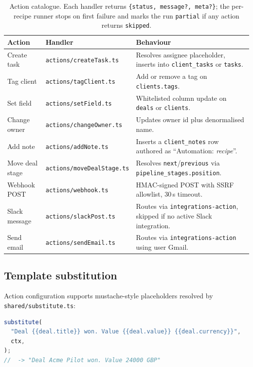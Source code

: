 \documentclass[11pt,a4paper,oneside]{article}
\newcommand{\code}[1]{\texttt{\small #1}}
\begin{document}
\begin{table}[H]
\centering
\small
\begin{tabularx}{\textwidth}{@{}llX@{}}
\toprule
\textbf{Action}     & \textbf{Handler}                & \textbf{Behaviour} \\
\midrule
Create task         & \code{actions/createTask.ts}    & Resolves assignee placeholder, inserts into \code{client\_tasks} or \code{tasks}. \\
Tag client          & \code{actions/tagClient.ts}     & Add or remove a tag on \code{clients.tags}. \\
Set field           & \code{actions/setField.ts}      & Whitelisted column update on \code{deals} or \code{clients}. \\
Change owner        & \code{actions/changeOwner.ts}   & Updates owner id plus denormalised name. \\
Add note            & \code{actions/addNote.ts}       & Inserts a \code{client\_notes} row authored as ``Automation: \emph{recipe}''. \\
Move deal stage     & \code{actions/moveDealStage.ts} & Resolves \code{next}/\code{previous} via \code{pipeline\_stages.position}. \\
Webhook POST        & \code{actions/webhook.ts}       & HMAC-signed POST with SSRF allowlist, 30\,s timeout. \\
Slack message       & \code{actions/slackPost.ts}     & Routes via \code{integrations-action}, skipped if no active Slack integration. \\
Send email          & \code{actions/sendEmail.ts}     & Routes via \code{integrations-action} using user Gmail. \\
\bottomrule
\end{tabularx}
\caption{Action catalogue. Each handler returns
\code{\{status, message?, meta?\}}; the per-recipe runner stops on
first failure and marks the run \code{partial} if any action returns
\code{skipped}.}
\label{tab:actions}
\end{table}

\subsection{Template substitution}

Action configuration supports mustache-style placeholders resolved by
\code{shared/substitute.ts}:

\begin{lstlisting}[language=TypeScript]
substitute(
  "Deal {{deal.title}} won. Value {{deal.value}} {{deal.currency}}",
  ctx,
);
//  -> "Deal Acme Pilot won. Value 24000 GBP"
\end{lstlisting}
\end{document}
